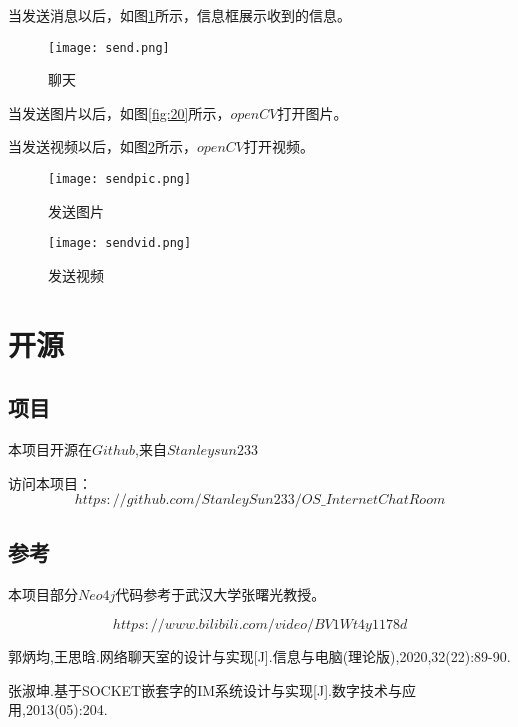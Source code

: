 \documentclass[forprint]{OSPaper}
\begin{document}
当发送消息以后，如图\ref{fig:19}所示，信息框展示收到的信息。

\begin{figure}[ht]
	\centering
	\texttt{[image: send.png]}
	\caption{聊天}
	\label{fig:19}
\end{figure}
\vspace*{2.5cm}
当发送图片以后，如图\ref{fig:20}所示，$openCV$打开图片。

当发送视频以后，如图\ref{fig:21}所示，$openCV$打开视频。

\begin{figure}[h]
	\begin{minipage}[t]{0.5\linewidth}
		\centering
		\label{fig:20}
		\texttt{[image: sendpic.png]}
		\caption{发送图片}
	\end{minipage}%
	\begin{minipage}[t]{0.5\linewidth}
		\centering
		\label{fig:21}
		\texttt{[image: sendvid.png]}
		\caption{发送视频}
	\end{minipage}%
\end{figure}

\chapter{开源}
\section{项目}
本项目开源在$Github$,来自$Stanleysun233$

访问本项目：
\begin{equation}
	https://github.com/StanleySun233/OS\_InternetChatRoom
\end{equation}
\section{参考}
本项目部分$Neo4j$代码参考于武汉大学张曙光教授。

\begin{equation}
	https://www.bilibili.com/video/BV1Wt4y1178d
\end{equation}
\cleardoublepage{}
{}
\begin{thebibliography}{99}

   郭炳均,王思晗.网络聊天室的设计与实现[J].信息与电脑(理论版),2020,32(22):89-90.

   张淑坤.基于SOCKET嵌套字的IM系统设计与实现[J].数字技术与应用,2013(05):204.

\end{thebibliography}
\end{document}
